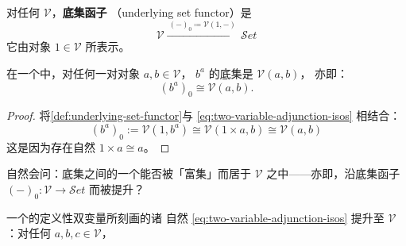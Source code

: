 \begin{definition}\label{def:underlying-set-functor}
对任何\trCartesianClosed{}\trCategory{} $\mathcal{V}$，\textbf{底集函子}
（underlying set functor）是\trFunctor
\[ \mathcal{V}\xrightarrow{\ (-)_{0}\coloneqq\mathcal{V}(1,-)\ }\mathcal{S}et \]
它由\trTerminal{}对象 $1\in\mathcal{V}$ 所表示。
\end{definition}

\begin{lemma}\label{lem:underlying-set-of-internal-hom}
在一个\trCartesianClosed{}\trCategory{}中，对任何一对对象
$a,b\in\mathcal{V}$，\trInternalHom{} $b^{a}$ 的底集是 $\mathcal{V}(a,b)$，
亦即：
\[ (b^{a})_{0}\cong\mathcal{V}(a,b). \]
\end{lemma}

\begin{proof}
将\cref{def:underlying-set-functor}与
\eqref{eq:two-variable-adjunction-isos} 相结合：
\[ (b^{a})_{0}:=\mathcal{V}(1,b^{a})\cong\mathcal{V}(1\times a,b)
   \cong\mathcal{V}(a,b) \]
这是因为存在自然\trIsomorphism{} $1\times a\cong a$。
\end{proof}

自然会问：底集之间的一个\trIsomorphism{}能否被「富集」而居于 $\mathcal{V}$
之中——亦即，沿底集函子 $(-)_{0}\colon\mathcal{V}\to\mathcal{S}et$ 而被提升？

\begin{lemma}\label{lem:isos-lift-to-V}
一个\trCartesianClosed{}\trCategory{}的定义性双变量\trAdjunction{}所刻画的诸
自然\trIsomorphism{} \eqref{eq:two-variable-adjunction-isos} 提升至
$\mathcal{V}$：对任何 $a,b,c\in\mathcal{V}$，
\begin{rveq}\label{eq:associativity-triangle-isos}
\end{rveq}
\end{lemma}

